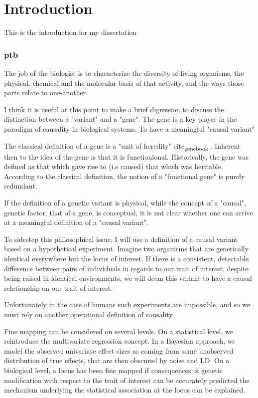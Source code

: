 \chapter{Introduction}
\label{introduction}

This is the introduction for my dissertation

\subsection{ptb}

The job of the biologist is to characterize the diversity of living organisms, the physical, chemical and the molecular basis of that activity, and the ways
those parts relate to one-another.

I think it is useful at this point to make a brief digression to discuss the distinction between a "variant" and a "gene". The gene is a key player in the paradigm of causality in biological systems. To have a meaningful "causal variant"

The classical definition of a gene is a "unit of heredity" cite\textsubscript{gene}\textsubscript{book} .  Inherent then to the idea of the gene is that it is functionional.  Historically,
the gene was defined as that which gave rise to (i.e caused) that which was heritable.
According to the classical definition, the notion of a "functional gene" is purely redundant.  

If the definition of a genetic variant is physical, while the concept of a "causal", genetic factor, that of a gene, is conceptual, 
it is not clear whether one can arrive at a meaningful definition of a "causal variant".  

To sidestep this philosophical issue, I will use a definition of a causal variant based on a hypothetical experiment.  Imagine two organisms that are
genetically identical everywhere but the locus of interest.  If there is a consistent, detectable difference between pairs of individuals in regards to our trait
 of interest, despite being raised in identical environments, we will deem this variant to have a causal relationship on our trait of interest.

 Unfortunately in the case of humans such experiments are impossible, and so we must rely on another operational definition of causality.

 
Fine mapping can be considered on several levels.
On a statistical level, we reintroduce the multivariate regression concept.
In a Bayesian approach, we model the observed univariate effect sizes as coming from some unobserved distribution of true effects,
that are then obscured by noise and LD.
On a biological level, a locus has been fine mapped if consequences of genetic modification with respect to the trait of
interest can be accurately predicted the mechanism underlying the statistical association at the locus can be explained.


